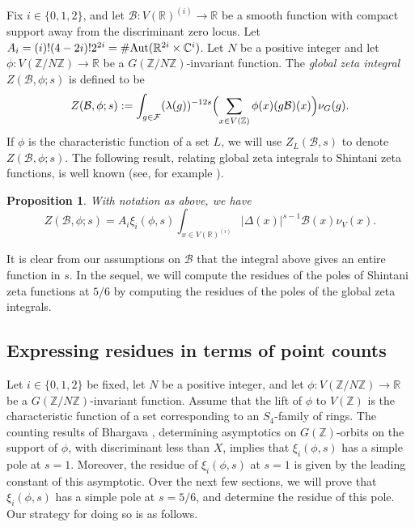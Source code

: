 \documentclass{article}
\def\Z{{\mathbb Z}}
\def\Aut{{\rm Aut}}
\def\R{{\mathbb R}}
\def\cB{{\mathcal B}}
\def\FF{{\mathcal F}}
\def\Z{{\mathbb Z}}
\def\C{{\mathbb C}}
\newtheorem{proposition}[theorem]{Proposition}
\begin{document}
Fix $i\in\{0,1,2\}$, and let $\cB:V(\R)^{(i)}\to\R$ be a smooth function with compact support away from the discriminant zero locus.  Let $A_i= (i)!(4-2i)!2^{2i}=\#\Aut(\R^{2i}\times \C^i)$. Let $N$ be a positive integer and let $\phi:V(\Z/N\Z)\to\R$ be a $G(\Z/N\Z)$-invariant function. The {\it global zeta integral} $Z(\cB,\phi;s)$ is defined to be
\begin{equation}\label{eq:global_zeta_int_V}
Z(\cB,\phi;s):=\int_{g\in \FF}(\lambda(g))^{-12s}\Bigl(\sum_{x\in V(\Z)}\phi(x)(g\cB)(x)\Bigr)\nu_G(g).
\end{equation}
If $\phi$ is the characteristic function of a set $L$, we will use $Z_L(\cB,s)$ to denote $Z(\cB,\phi;s)$. The following result, relating global zeta integrals to Shintani zeta functions, is well known (see, for example \cite[\S5]{Kimura_book}).
\begin{proposition}\label{prop_global_zeta_shintani_G}
With notation as above, we have
\begin{equation*}
Z(\cB,\phi;s)=A_i\xi_i(\phi,s)\int_{x\in V(\R)^{(i)}}|\Delta(x)|^{s-1}\cB(x)\nu_V(x).
\end{equation*}
\end{proposition}
It is clear from our assumptions on $\cB$ that the integral above gives an entire function in $s$. In the sequel, we will compute the residues of the poles of Shintani zeta functions at $5/6$ by computing the residues of the poles of the global zeta integrals.





\subsection{Expressing residues in terms of point counts}
Let $i\in \{0,1,2\}$ be fixed, let $N$ be a positive integer, and let $\phi:V(\Z/N\Z)\to\R$ be a $G(\Z/N\Z)$-invariant function. Assume that the lift of $\phi$ to $V(\Z)$ is the characteristic function of a set corresponding to an $S_4$-family of rings. The counting results of Bhargava \cite{dodqf}, determining asymptotics on $G(\Z)$-orbits on the support of $\phi$, with discriminant less than $X$, implies that $\xi_i(\phi,s)$ has a simple pole at $s=1$. Moreover, the residue of $\xi_i(\phi,s)$ at $s=1$ is given by the leading constant of this asymptotic.
Over the next few sections, we will prove that $\xi_i(\phi,s)$ has a simple pole at $s=5/6$, and determine the residue of this pole. Our strategy for doing so is as follows.
\end{document}
